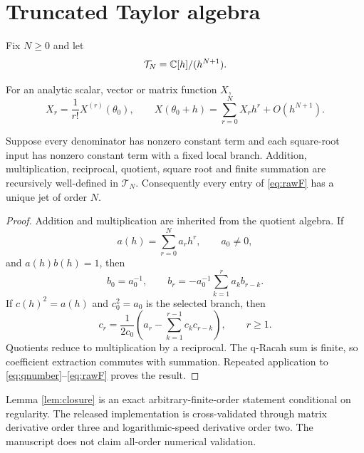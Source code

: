 \section{Truncated Taylor algebra}
Fix $N\ge0$ and let
\begin{equation}
\mathcal T_N=\mathbb C[h]/(h^{N+1}).
\label{eq:TN}
\end{equation}

\begin{definition}
For an analytic scalar, vector or matrix function $X$,
\begin{equation}
X_r=\frac{1}{r!}X^{(r)}(\theta_0),
\qquad
X(\theta_0+h)=\sum_{r=0}^{N}X_rh^r+O(h^{N+1}).
\label{eq:jetconvention}
\end{equation}
\end{definition}

\begin{lemma}
\label{lem:closure}
Suppose every denominator has nonzero constant term and each square-root input has nonzero constant term with a fixed local branch.  Addition, multiplication, reciprocal, quotient, square root and finite summation are recursively well-defined in $\mathcal T_N$.  Consequently every entry of \eqref{eq:rawF} has a unique jet of order $N$.
\end{lemma}

\begin{proof}
Addition and multiplication are inherited from the quotient algebra.  If
\[
a(h)=\sum_{r=0}^{N}a_rh^r,
\qquad a_0\ne0,
\]
and $a(h)b(h)=1$, then
\begin{equation}
b_0=a_0^{-1},
\qquad
b_r=-a_0^{-1}\sum_{k=1}^{r}a_kb_{r-k}.
\label{eq:reciprocal}
\end{equation}
If $c(h)^2=a(h)$ and $c_0^2=a_0$ is the selected branch, then
\begin{equation}
c_r=\frac{1}{2c_0}
\left(a_r-\sum_{k=1}^{r-1}c_kc_{r-k}\right),
\qquad r\ge1.
\label{eq:sqrtrecurrence}
\end{equation}
Quotients reduce to multiplication by a reciprocal.  The q-Racah sum is finite, so coefficient extraction commutes with summation.  Repeated application to \eqref{eq:qnumber}--\eqref{eq:rawF} proves the result.
\end{proof}

\begin{remark}
Lemma \ref{lem:closure} is an exact arbitrary-finite-order statement conditional on regularity.  The released implementation is cross-validated through matrix derivative order three and logarithmic-speed derivative order two.  The manuscript does not claim all-order numerical validation.
\end{remark}

